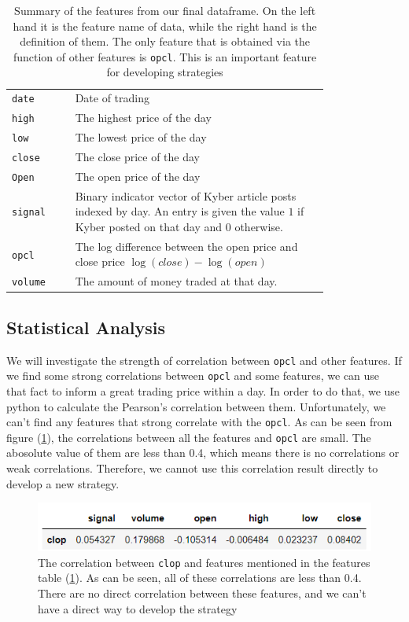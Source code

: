 \documentclass[twoside]{report}
\newcommand{\code}{\texttt}
\begin{document}
\begin{spacing}{1}
\begin{table}[!htp]
    \centering
    \begin{tabular}{|l|p{0.8\linewidth}|}
        \hline
        \code{date}  & Date of trading \\
        \code{high} & The highest price of the day\\
       \code{low}& The lowest price of the day\\
       \code{close} & The close price of the day\\
       \code{Open}& The open price of the day\\
         \code{signal} & Binary indicator vector of Kyber article posts indexed by day. An entry is given the value $1$ if Kyber posted on that day and $0$ otherwise.\\
         \code{opcl}  & The log difference between the open price and close price \code{$\log(close)-\log(open)$} \\
        \code{volume} & The amount of money traded at that day.\\ \hline
    \end{tabular}\vspace{2mm}
    \caption{Summary of the features from our final dataframe. On the left hand it is the feature name of data, while the right hand is the definition of them. The only feature that is obtained via the function of other features is \code{opcl}. This is an important feature for developing strategies }
    \label{tab:feature}
\end{table}


\subsection{Statistical Analysis}
We will investigate the strength of correlation between \code{opcl} and other features. If we find some strong correlations between \code{opcl} and some features, we can use that fact to inform a great trading price within a day. In order to do that, we use python to calculate the Pearson's correlation between them. Unfortunately, we can't find any features that strong correlate with the \code{opcl}. As can be seen from figure (\ref{medium stats}), the correlations between all the features and \code{opcl} are small. The abosolute value of them are less than 0.4, which means there is no correlations or weak correlations. Therefore, we cannot use this correlation result directly to develop a new strategy.

\begin{figure}[!htbp]
    \centering
    \includegraphics{Images/Medium stats.png}
    \caption{The correlation between \code{clop} and features mentioned in the features table (\ref{tab:feature}). As can be seen, all of these correlations are less than 0.4. There are no direct correlation between these features, and we can't have a direct way to develop the strategy}
    \label{medium stats}
\end{figure}



\end{spacing}
\end{document}
